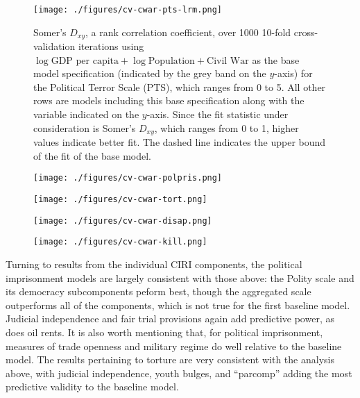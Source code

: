 \documentclass[12pt]{article}
\begin{document}
\begin{figure}[!htpb]
\centering
\texttt{[image: ./figures/cv-cwar-pts-lrm.png]}
\caption{Somer's $D_{xy}$, a rank correlation coefficient, over 1000 10-fold cross-validation iterations using $\log \text{GDP per capita} + \log \text{Population} + \text{Civil War}$ as the base model specification (indicated by the grey band on the $y$-axis) for the Political Terror Scale (PTS), which ranges from 0 to 5. All other rows are models including this base specification along with the variable indicated on the $y$-axis. Since the fit statistic under consideration is Somer's $D_{xy}$, which ranges from 0 to 1, higher values indicate better fit. The dashed line indicates the upper bound of the fit of the base model.}
\caption{}
\label{fig:cv-cwar-pts-lrm}
\end{figure}

\begin{figure}[!htpb]
\centering
\texttt{[image: ./figures/cv-cwar-polpris.png]}
\caption{}
\label{fig:cv-cwar-polpris}
\end{figure}

\begin{figure}[!htpb]
\centering
\texttt{[image: ./figures/cv-cwar-tort.png]}
\caption{}
\label{fig:cv-cwar-tort}
\end{figure}

\begin{figure}[!htpb]
\centering
\texttt{[image: ./figures/cv-cwar-disap.png]}
\caption{}
\label{fig:cv-cwar-disap}
\end{figure}

\begin{figure}[!htpb]
\centering
\texttt{[image: ./figures/cv-cwar-kill.png]}
\caption{}
\label{fig:cv-cwar-kill}
\end{figure}

Turning to results from the individual CIRI components, the political imprisonment models are largely consistent with those above: the Polity scale and its democracy subcomponents peform best, though the aggregated scale outperforms all of the components, which is not true for the first baseline model. Judicial independence and fair trial provisions again add predictive power, as does oil rents. It is also worth mentioning that, for political imprisonment, measures of trade openness and military regime do well relative to the baseline model. The results pertaining to torture are very consistent with the analysis above, with judicial independence, youth bulges, and ``parcomp'' adding the most predictive validity to the baseline model. 
\end{document}
